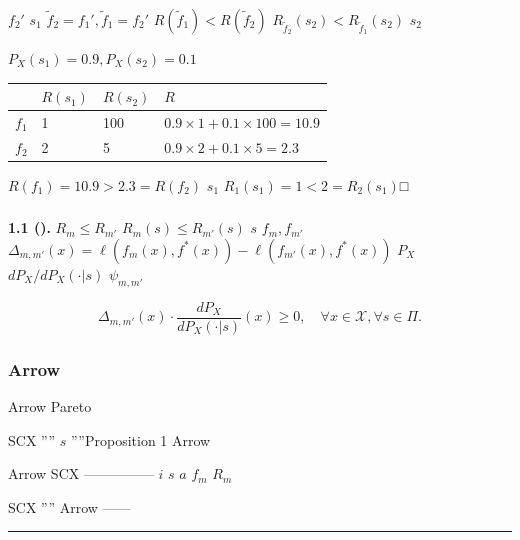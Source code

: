 \documentclass[
  12pt,
]{article}
\begin{document}
 \(f_2'\)  \(s_1\) 
\(\tilde{f}_2 = f_1', \tilde{f}_1 = f_2'\)
\(R(\tilde{f}_1) < R(\tilde{f}_2)\) 
\(R_{\tilde{f}_2}(s_2) < R_{\tilde{f}_1}(s_2)\)  \(s_2\) 

\textbf{} 
\(P_X(s_1) = 0.9, P_X(s_2) = 0.1\)

\begin{longtable}[]{@{}llll@{}}
\toprule\noalign{}
 & \(R(s_1)\) & \(R(s_2)\) &  \(R\) \\
\midrule\noalign{}
\endhead
\bottomrule\noalign{}
\endlastfoot
\(f_1\) & 1 & 100 & \(0.9 \times 1 + 0.1 \times 100 = 10.9\) \\
\(f_2\) & 2 & 5 & \(0.9 \times 2 + 0.1 \times 5 = 2.3\) \\
\end{longtable}

 \(R(f_1) = 10.9 > 2.3 = R(f_2)\) \(s_1\) 
\(R_1(s_1) = 1 < 2 = R_2(s_1)\)□

\subsubsection{}\label{ux5168ux5c40ux6392ux5e8fux5145ux5206ux7684ux6761ux4ef6}

\textbf{ 1.1 ().}  \(R_m \leq R_{m'}\)
 \(R_m(s) \leq R_{m'}(s)\)  \(s\)
 \(f_m, f_{m'}\)
\(\Delta_{m,m'}(x) = \ell(f_m(x), f^*(x)) - \ell(f_{m'}(x), f^*(x))\)
 \(P_X\)  \(dP_X/dP_X(\cdot|s)\)
 \(\psi_{m,m'}\) 

\[\Delta_{m,m'}(x) \cdot \frac{dP_X}{dP_X(\cdot|s)}(x) \geq 0, \quad \forall x \in \mathcal{X}, \forall s \in \Pi.\]

\subsubsection{ Arrow
}\label{ux4e0e-arrow-ux4e0dux53efux80fdux5b9aux7406ux7684ux7c7bux6bd4}

Arrow 
Pareto 

SCX '''' \(s\)
''''Proposition 1
\textbf{} Arrow


 \textbar{} Arrow  \textbar{} SCX \textbar{}
\textbar-----------\textbar-----\textbar{} \textbar{}  \(i\)
\textbar{}  \(s\) \textbar{} \textbar{}  \(a\) \textbar{}
 \(f_m\) \textbar{} \textbar{}  \textbar{} 
\(R_m\) \textbar{} \textbar{}  \textbar{} 
\textbar{} \textbar{}  \textbar{} 
\textbar{}

SCX '''' Arrow
------

\begin{center}\rule{0.5\linewidth}{0.5pt}\end{center}
\end{document}
